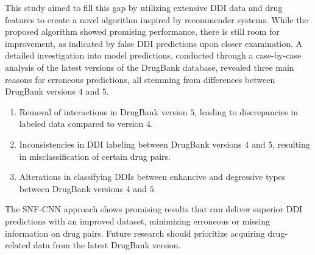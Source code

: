 \documentclass[unnumsec,webpdf,contemporary,large]{oup-authoring-template}%
\theoremstyle{thmstyleone}%
\theoremstyle{thmstyletwo}%
\theoremstyle{thmstylethree}%
\begin{document}
This study aimed to fill this gap by utilizing extensive DDI data and drug features to create a novel algorithm inspired by recommender systems. While the proposed algorithm showed promising performance, there is still room for improvement, as indicated by false DDI predictions upon closer examination. A detailed investigation into model predictions, conducted through a case-by-case analysis of the latest versions of the DrugBank database, revealed three main reasons for erroneous predictions, all stemming from differences between DrugBank versions $4$ and $5$.
\begin{enumerate}
\item Removal of interactions in DrugBank version $5$, leading to discrepancies in labeled data compared to version $4$.
\item Inconsistencies in DDI labeling between DrugBank versions $4$ and $5$, resulting in misclassification of certain drug pairs.
\item Alterations in classifying DDIs between enhancive and degressive types between DrugBank versions $4$ and $5$.
\end{enumerate}
The SNF-CNN approach shows promising results that can deliver superior DDI predictions with an improved dataset, minimizing erroneous or missing information on drug pairs. Future research should prioritize acquiring drug-related data from the latest DrugBank version.
\end{document}
